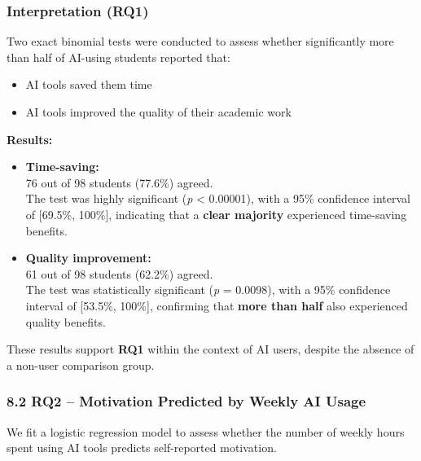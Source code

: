 \documentclass[
]{article}
\newenvironment{Shaded}{\begin{snugshade}}{\end{snugshade}}
\newcommand{\AttributeTok}[1]{\textcolor[rgb]{0.13,0.29,0.53}{#1}}
\newcommand{\CommentTok}[1]{\textcolor[rgb]{0.56,0.35,0.01}{\textit{#1}}}
\newcommand{\FunctionTok}[1]{\textcolor[rgb]{0.13,0.29,0.53}{\textbf{#1}}}
\newcommand{\NormalTok}[1]{#1}
\newcommand{\OtherTok}[1]{\textcolor[rgb]{0.56,0.35,0.01}{#1}}
\newcommand{\SpecialCharTok}[1]{\textcolor[rgb]{0.81,0.36,0.00}{\textbf{#1}}}
\providecommand{\tightlist}{%
  \setlength{\itemsep}{0pt}\setlength{\parskip}{0pt}}
\begin{document}
\subsubsection{Interpretation (RQ1)}\label{interpretation-rq1-1}

Two exact binomial tests were conducted to assess whether significantly
more than half of AI-using students reported that:

\begin{itemize}
\tightlist
\item
  AI tools saved them time
\item
  AI tools improved the quality of their academic work
\end{itemize}

\textbf{Results:}

\begin{itemize}
\item
  \textbf{Time-saving:}\\
  76 out of 98 students (77.6\%) agreed.\\
  The test was highly significant (\emph{p} \textless{} 0.00001), with a
  95\% confidence interval of {[}69.5\%, 100\%{]}, indicating that a
  \textbf{clear majority} experienced time-saving benefits.
\item
  \textbf{Quality improvement:}\\
  61 out of 98 students (62.2\%) agreed.\\
  The test was statistically significant (\emph{p} = 0.0098), with a
  95\% confidence interval of {[}53.5\%, 100\%{]}, confirming that
  \textbf{more than half} also experienced quality benefits.
\end{itemize}

These results support \textbf{RQ1} within the context of AI users,
despite the absence of a non-user comparison group.

\subsubsection{8.2 RQ2 -- Motivation Predicted by Weekly AI
Usage}\label{rq2-motivation-predicted-by-weekly-ai-usage}

We fit a logistic regression model to assess whether the number of
weekly hours spent using AI tools predicts self-reported motivation.

\begin{Shaded}
\end{Shaded}
\end{document}
